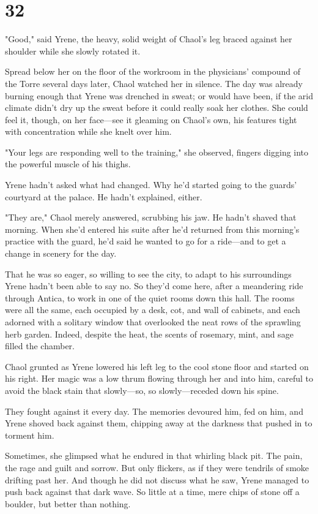 
\chapter{32}

"Good," said Yrene, the heavy, solid weight of Chaol's leg braced against her shoulder while she slowly rotated it.

Spread below her on the floor of the workroom in the physicians' compound of the Torre several days later, Chaol watched her in silence. The day was already burning enough that Yrene was drenched in sweat; or would have been, if the arid climate didn't dry up the sweat before it could really soak her clothes. She could feel it, though, on her face---see it gleaming on Chaol's own, his features tight with concentration while she knelt over him.

"Your legs are responding well to the training," she observed, fingers digging into the powerful muscle of his thighs.

Yrene hadn't asked what had changed. Why he'd started going to the guards' courtyard at the palace. He hadn't explained, either.

"They are," Chaol merely answered, scrubbing his jaw. He hadn't shaved that morning. When she'd entered his suite after he'd returned from this morning's practice with the guard, he'd said he wanted to go for a ride---and to get a change in scenery for the day.

That he was so eager, so willing to see the city, to adapt to his surroundings  Yrene hadn't been able to say no. So they'd come here, after a meandering ride through Antica, to work in one of the quiet rooms down this hall. The rooms were all the same, each occupied by a desk, cot, and wall of cabinets, and each adorned with a solitary window that overlooked the neat rows of the sprawling herb garden. Indeed, despite the heat, the scents of rosemary, mint, and sage filled the chamber.

Chaol grunted as Yrene lowered his left leg to the cool stone floor and started on his right. Her magic was a low thrum flowing through her and into him, careful to avoid the black stain that slowly---so, so slowly---receded down his spine.

They fought against it every day. The memories devoured him, fed on him, and Yrene shoved back against them, chipping away at the darkness that pushed in to torment him.

Sometimes, she glimpsed what he endured in that whirling black pit. The pain, the rage and guilt and sorrow. But only flickers, as if they were tendrils of smoke drifting past her. And though he did not discuss what he saw, Yrene managed to push back against that dark wave. So little at a time, mere chips of stone off a boulder, but  better than nothing.

